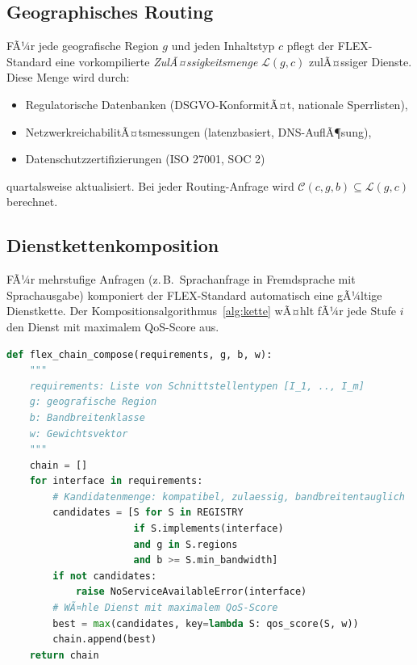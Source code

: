 ﻿\documentclass[a4paper,12pt]{article}
\theoremstyle{definition}
\begin{document}
\subsection{Geographisches Routing}

FÃ¼r jede geografische Region $g$ und jeden Inhaltstyp $c$ pflegt der FLEX-Standard eine vorkompilierte \emph{ZulÃ¤ssigkeitsmenge} $\mathcal{L}(g, c)$ zulÃ¤ssiger Dienste. Diese Menge wird durch:

\begin{itemize}
    \item Regulatorische Datenbanken (DSGVO-KonformitÃ¤t, nationale Sperrlisten),
    \item NetzwerkreichabilitÃ¤tsmessungen (latenzbasiert, DNS-AuflÃ¶sung),
    \item Datenschutzzertifizierungen (ISO 27001, SOC 2)
\end{itemize}

quartalsweise aktualisiert. Bei jeder Routing-Anfrage wird $\mathcal{C}(c,g,b) \subseteq \mathcal{L}(g,c)$ berechnet.

\subsection{Dienstkettenkomposition}

FÃ¼r mehrstufige Anfragen (z.\,B.\ Sprachanfrage in Fremdsprache mit Sprachausgabe) komponiert der FLEX-Standard automatisch eine gÃ¼ltige Dienstkette. Der Kompositionsalgorithmus~\ref{alg:kette} wÃ¤hlt fÃ¼r jede Stufe $i$ den Dienst mit maximalem QoS-Score aus.

\begin{lstlisting}[caption={FLEX-CHAIN-COMPOSE: Greedy-Kettenkomposition},label={alg:kette},language=Python]
def flex_chain_compose(requirements, g, b, w):
    """
    requirements: Liste von Schnittstellentypen [I_1, .., I_m]
    g: geografische Region
    b: Bandbreitenklasse
    w: Gewichtsvektor
    """
    chain = []
    for interface in requirements:
        # Kandidatenmenge: kompatibel, zulaessig, bandbreitentauglich
        candidates = [S for S in REGISTRY
                      if S.implements(interface)
                      and g in S.regions
                      and b >= S.min_bandwidth]
        if not candidates:
            raise NoServiceAvailableError(interface)
        # WÃ¤hle Dienst mit maximalem QoS-Score
        best = max(candidates, key=lambda S: qos_score(S, w))
        chain.append(best)
    return chain
\end{lstlisting}
\end{document}
